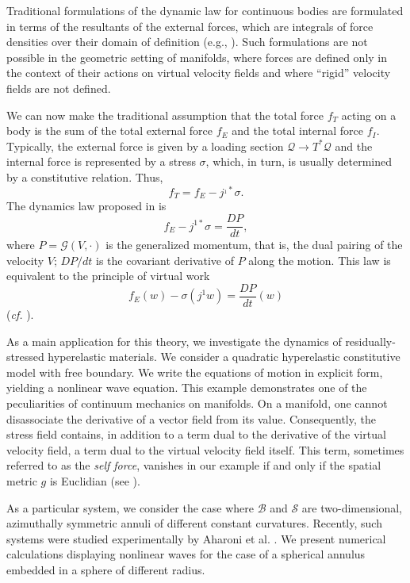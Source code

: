 \documentclass[smallextended]{svjour3}
\begin{document}
Traditional formulations of the dynamic law for continuous bodies are formulated in terms of the resultants of the external forces, which are integrals of force densities over their domain of definition (e.g., \cite[p.~170]{Tru91}). Such formulations are not possible in the geometric setting of manifolds, where forces are defined only in the context of their actions on virtual velocity fields and where ``rigid'' velocity fields are not defined.

We can now make the traditional assumption that the total force $f_T$ acting on a body is the sum of the total external force $f_E$ and the total internal force  $f_I$. Typically, the external force is given by a loading section ${\mathcal{Q}}\to T^*{\mathcal{Q}}$ and the internal force is represented by a stress $\sigma$, which, in turn, is usually determined by a constitutive relation. Thus,
\[
f_T=f_E - j^{_1*}\sigma.
\]
 The dynamics law proposed in  is
\[
f_E - j^{1*}\sigma=\frac{DP}{dt},
\]
where $P={\mathcal{G}}(V,\cdot)$ is the generalized momentum, that is, the dual pairing of the velocity $V$; ${DP}/{dt}$ is the covariant derivative of $P$ along the motion. This law is equivalent to the principle of virtual work
\[
f_E(w) - \sigma(j^1 w)=\frac{DP}{dt}(w)
\]
(\emph{cf.} \cite[p.~168]{MH83}).

As a main application for this theory, we investigate the dynamics of residually-stressed hyperelastic materials. We consider a quadratic hyperelastic constitutive model with free boundary. We write the equations of motion in explicit form, yielding a nonlinear wave equation. This example demonstrates one of the peculiarities of continuum mechanics on manifolds. On a manifold, one cannot disassociate the derivative of a vector field from its value. Consequently, the stress field contains, in addition to a term dual to the derivative of the virtual velocity field, a term dual to the virtual velocity field itself. This term, sometimes referred to as the \emph{self force}, vanishes in our example if and only if the spatial metric $g$ is Euclidian  (see \cite{Cap89}). 

As a particular system, we consider the case where ${\mathcal{B}}$ and ${\mathcal{S}}$ are two-dimensional, azimuthally symmetric annuli of different constant curvatures. Recently, such systems were studied experimentally by Aharoni et al. \cite{AKMMS16}.
We present numerical calculations displaying nonlinear waves for the case of a spherical annulus embedded in a sphere of different radius. 
\end{document}
